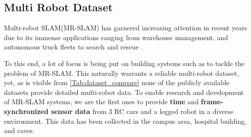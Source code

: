 \documentclass[10pt,twocolumn,letterpaper]{article}
\begin{document}

\subsection{Multi Robot Dataset}

Multi-robot SLAM(MR-SLAM) has garnered increasing attention in recent years due to its immense applications ranging from warehouse management, and autonomous truck fleets \cite{lajoie2022} to search and rescue \cite{9220149}. 

To this end, a lot of focus is being put on building systems such as \cite{https://doi.org/10.48550/arxiv.2205.13135}  to tackle the problem of MR-SLAM. This naturally warrants a reliable multi-robot dataset, yet, as is visible from \ref{Tab:dataset_compare} none of the publicly available datasets provide detailed multi-robot data. To enable research and development of MR-SLAM systems,  we are the first ones to provide \textbf{time} and \textbf{frame-synchronized sensor data} from 3 RC cars and a legged robot in a diverse environment. This data has been collected in the campus area, hospital building, and caves.



\end{document}

